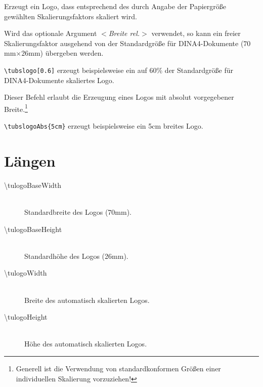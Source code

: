 \documentclass{scrartcl}
\begin{document}
\begin{description}\label{cmd:tulogo}
  \item[\color{tuRed}\mdseries\ttfamily \textbackslash tubslogo%
    {[\textcolor{tuGreenDark}{\sffamily\itshape $<$Breite rel.$>$}]}]
    Erzeugt ein Logo, dass entsprechend des durch Angabe der Papiergröße
    gewählten Skalierungsfaktors skaliert wird.

    Wird das optionale Argument {\sffamily\itshape $<$Breite rel.$>$}
    verwendet, so kann ein freier Skalierungsfaktor ausgehend von der
    Standardgröße für DINA4-Dokumente ($70$mm$\times 26$mm) übergeben werden.

    \lstinline!\tubslogo[0.6]! erzeugt beispielsweise ein auf 60\% der 
    Standardgröße für DINA4-Dokumente skaliertes Logo.

  \item[\color{tuRed}\ttfamily \textbackslash tubslogoAbs%
    \{\textcolor{tuGreenDark}{Breite abs.}\}]
    Dieser Befehl erlaubt die Erzeugung eines Logos mit absolut vorgegebener
    Breite.\footnote{Generell ist die Verwendung von standardkonformen Größen
    einer individuellen Skalierung vorzuziehen!}

    \lstinline!\tubslogoAbs{5cm}! erzeugt beispielsweise ein 5cm breites Logo.
\end{description}


\section{Längen}
  \begin{description}
    \item[\mdseries\ttfamily \textbackslash tulogoBaseWidth]\hfill\\
      Standardbreite des Logos (70mm).
    \item[\mdseries\ttfamily \textbackslash tulogoBaseHeight]\hfill\\
      Standardhöhe des Logos (26mm).
    \item[\mdseries\ttfamily \textbackslash tulogoWidth]\hfill\\
      Breite des automatisch skalierten Logos.
    \item[\mdseries\ttfamily \textbackslash tulogoHeight]\hfill\\
      Höhe des automatisch skalierten Logos.
  \end{description}
\end{document}
